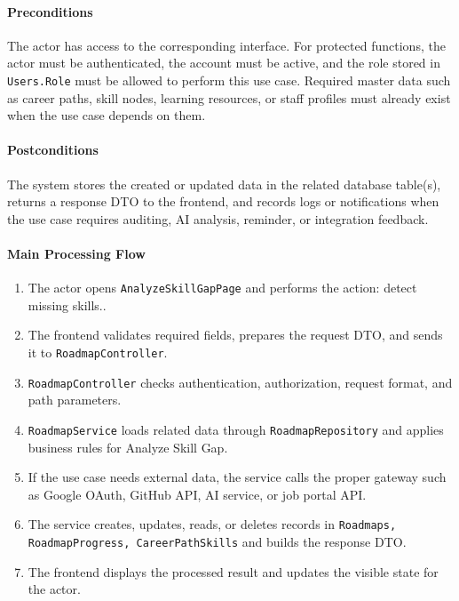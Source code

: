 \paragraph{Preconditions}

The actor has access to the corresponding interface. For protected functions, the actor must be authenticated, the account must be active, and the role stored in \texttt{Users.Role} must be allowed to perform this use case. Required master data such as career paths, skill nodes, learning resources, or staff profiles must already exist when the use case depends on them.

\paragraph{Postconditions}

The system stores the created or updated data in the related database table(s), returns a response DTO to the frontend, and records logs or notifications when the use case requires auditing, AI analysis, reminder, or integration feedback.

\paragraph{Main Processing Flow}

\begin{enumerate}
    \item The actor opens \texttt{AnalyzeSkillGapPage} and performs the action: detect missing skills..
    \item The frontend validates required fields, prepares the request DTO, and sends it to \texttt{RoadmapController}.
    \item \texttt{RoadmapController} checks authentication, authorization, request format, and path parameters.
    \item \texttt{RoadmapService} loads related data through \texttt{RoadmapRepository} and applies business rules for Analyze Skill Gap.
    \item If the use case needs external data, the service calls the proper gateway such as Google OAuth, GitHub API, AI service, or job portal API.
    \item The service creates, updates, reads, or deletes records in \texttt{Roadmaps, RoadmapProgress, CareerPathSkills} and builds the response DTO.
    \item The frontend displays the processed result and updates the visible state for the actor.
\end{enumerate}

